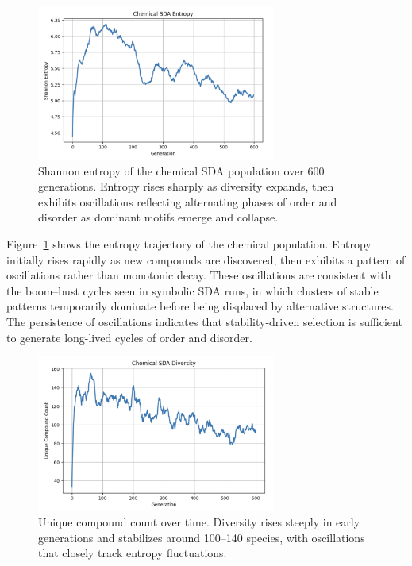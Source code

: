 \documentclass[life,article,submit,pdftex,moreauthors]{Definitions/mdpi}
\begin{document}
\begin{figure}[H]
    \centering
    \includegraphics[width=0.7\textwidth]{SDA-chem-entropy.png}
    \caption{Shannon entropy of the chemical SDA population over 600 generations. Entropy rises sharply as diversity expands, then exhibits oscillations reflecting alternating phases of order and disorder as dominant motifs emerge and collapse.}
    \label{fig:chem-entropy}
\end{figure}

Figure~\ref{fig:chem-entropy} shows the entropy trajectory of the chemical population. Entropy initially rises rapidly as new compounds are discovered, then exhibits a pattern of oscillations rather than monotonic decay. These oscillations are consistent with the boom–bust cycles seen in symbolic SDA runs, in which clusters of stable patterns temporarily dominate before being displaced by alternative structures. The persistence of oscillations indicates that stability-driven selection is sufficient to generate long-lived cycles of order and disorder.  

\begin{figure}[H]
    \centering
    \includegraphics[width=0.7\textwidth]{SDA-chem-diversity.png}
    \caption{Unique compound count over time. Diversity rises steeply in early generations and stabilizes around 100–140 species, with oscillations that closely track entropy fluctuations.}
    \label{fig:chem-diversity}
\end{figure}
\end{document}
